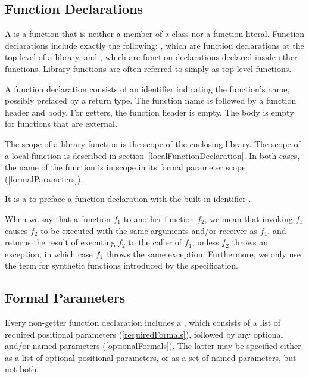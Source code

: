 \documentclass[makeidx]{article}
\begin{document}
\subsection{Function Declarations}

\LMHash{}%
A  is a function that
is neither a member of a class nor a function literal.
Function declarations include exactly the following:
,
which are function declarations
at the top level of a library, and
,
which are function declarations declared inside other functions.
Library functions are often referred to simply as top-level functions.

\LMHash{}%
A function declaration consists of an identifier indicating the function's name,
possibly prefaced by a return type.
The function name is followed by a function header and body.
For getters, the function header is empty.
The body is empty for functions that are external.

\LMHash{}%
The scope of a library function is the scope of the enclosing library.
The scope of a local function is described
in section~\ref{localFunctionDeclaration}.
In both cases, the name of the function is in scope
in its formal parameter scope
(\ref{formalParameters}).

\LMHash{}%
It is a  to preface a function declaration
with the built-in identifier \STATIC.

\LMHash{}%
When we say that a function $f_1$  to another function $f_2$,
we mean that invoking $f_1$ causes $f_2$ to be executed
with the same arguments and/or receiver as $f_1$,
and returns the result of executing $f_2$ to the caller of $f_1$,
unless $f_2$ throws an exception,
in which case $f_1$ throws the same exception.
Furthermore, we only use the term for
synthetic functions introduced by the specification.


\subsection{Formal Parameters}

\LMHash{}%
Every non-getter function declaration includes a
,
which consists of a list of required positional parameters
(\ref{requiredFormals}),
followed by any optional and/or named parameters (\ref{optionalFormals}).
The latter may be specified
either as a list of optional positional parameters,
or as a set of named parameters,
but not both.
\end{document}
